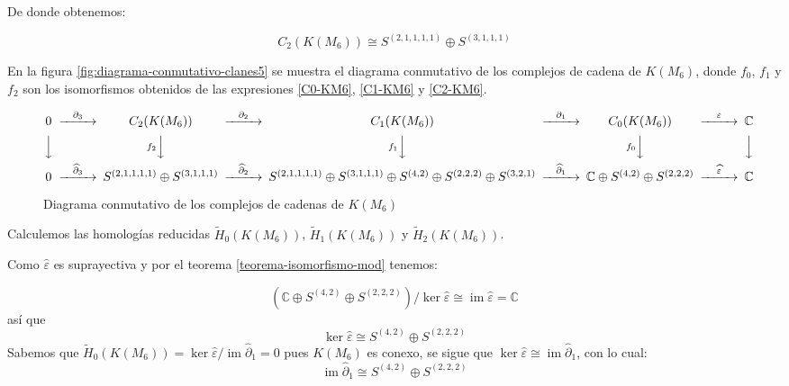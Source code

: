 \documentclass[12pt]{book}
\theoremstyle{definition}
\DeclareMathOperator{\im}{im}
\newcounter{in}
\begin{document}
De donde obtenemos:

\begin{equation}
  C_{2}(K(M_{6}))\cong S^{(2,1,1,1,1)}\oplus S^{(3,1,1,1)}
  \label{C2-KM6}
\end{equation}

En la figura \ref{fig:diagrama-conmutativo-clanes5} se muestra el diagrama
conmutativo de los complejos de cadena de $K(M_{6})$, donde $f_{0}$,
$f_{1}$ y $f_{2}$ son los isomorfismos obtenidos de las expresiones
\ref{C0-KM6}, \ref{C1-KM6} y \ref{C2-KM6}.

\begin{sidewaysfigure}%
  {\small
    \[
    \begin{CD}
      0 @>{\partial_{3}}>> C_{2}(K(M_{6})) @>{\partial_{2}}>> C_{1}(K(M_{6})) @>{\partial_{1}}>> C_{0}(K(M_{6})) @>{\varepsilon}>> \mathbb{C}\\
      @VVV   @Vf_{2}VV   @Vf_{1}VV   @Vf_{0}VV   @VVV    \\
      0  @>{\widehat\partial_{3}}>> S^{(2,1,1,1,1)}\oplus S^{(3,1,1,1)} @>{\widehat\partial_{2}}>>
      S^{(2,1,1,1,1)}\oplus S^{(3,1,1,1)}\oplus S^{(4,2)}\oplus
      S^{(2,2,2)}\oplus S^{(3,2,1)} @>{\widehat\partial_{1}}>>
      \mathbb{C} \oplus S^{(4,2)}\oplus S^{(2,2,2)} @>{\widehat
        \varepsilon}>> \mathbb{C}
    \end{CD}
    \]
  }
  
  \caption{Diagrama conmutativo de los complejos de cadenas de $K(M_{6})$}
  \label{fig:diagrama-conmutativo-clanes6}
\end{sidewaysfigure}

Calculemos las homologías reducidas $\widetilde H_{0}(K(M_{6}))$,
$\widetilde H_{1}(K(M_{6}))$ y $\widetilde H_{2}(K(M_{6}))$.

Como $\widehat\varepsilon$ es suprayectiva y por el teorema
\ref{teorema-isomorfismo-mod} tenemos:



\begin{equation*}
  (\mathbb{C} \oplus S^{(4,2)}\oplus S^{(2,2,2)})/\ker\widehat\varepsilon\cong \im \widehat\varepsilon=\mathbb{C}
\end{equation*}
así que
\begin{equation*}
  \label{ker0-KM6}
  \ker\widehat\varepsilon\cong S^{(4,2)}\oplus S^{(2,2,2)}
\end{equation*}
Sabemos que $\widetilde H_{0}(K(M_{6}))=\ker \widehat\varepsilon/\im
\widehat\partial_{1}=0$ pues $K(M_{6})$ es conexo, se sigue que $\ker \widehat\varepsilon\cong
\im\widehat\partial_{1}$, con lo cual:
\begin{equation}
  \label{im1-KM6}
  \im \widehat\partial_{1}\cong S^{(4,2)}\oplus S^{(2,2,2)}
\end{equation}
\end{document}
